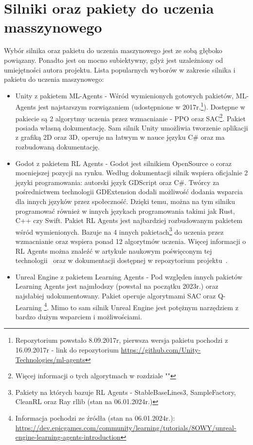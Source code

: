 \documentclass{SGGW-thesis}
\begin{document}
\section{Silniki oraz pakiety do uczenia masszynowego}
Wybór silnika oraz pakietu do uczenia maszynowego jest ze sobą głęboko powiązany. Ponadto jest on mocno subiektywny, gdyż jest uzależniony od umiejętności autora projektu. Lista popularnych wyborów w zakresie silnika i pakietu do uczenia maszynowego:
\begin{itemize}
  \item{Unity z pakietem ML-Agents - Wśród wymienionych gotowych pakietów, ML-Agents jest najstarszym rozwiązaniem (udostępnione w 2017r.\footnote{Repozytorium powstało 8.09.2017r, pierwsza wersja pakietu pochodzi z 16.09.2017r - link do repozytorium \url{https://github.com/Unity-Technologies/ml-agents}}).
  Dostępne w pakiecie są 2 algorytmy uczenia przez wzmacnianie - PPO oraz SAC\footnote{Więcej informacji o tych algorytmach w rozdziale ""}. Pakiet posiada własną dokumentację\cite{MLAgentsDocs}. 
  Sam silnik Unity umożliwia tworzenie aplikacji z grafiką 2D oraz 3D, operuje na łatwym w nauce języku C\# oraz ma rozbudowaną dokumentację\cite{UnityDocs}.}
  \item{Godot z pakietem RL Agents - Godot jest silnikiem OpenSource o coraz mocniejszej pozycji na rynku. Według dokumentacji\cite{GodotDocs}
  silnik wspiera oficjalnie 2 języki programowania: autorski język GDScript oraz C\#. Twórcy za pośrednictwem technologii GDExtension dodali możliwość dodania wsparcia dla innych języków przez społeczność.
  Dzięki temu, można na tym silniku programować również w innych językach programowania takimi jak Rust, C++ czy Swift. Pakiet RL Agents jest najbardziej rozbudowanym pakietem wśród wymienionych.
  Bazuje na 4 innych pakietach\footnote{Pakiety na których bazuje RL Agents - StableBaseLines3, SampleFactory, CleanRL oraz Ray rllib (stan na 06.01.2024r.)} do uczenia przez wzmacnianie
  oraz wspiera ponad 12 algorytmów uczenia. Więcej informacji o RL Agents można znaleźć w artykule naukowym poświęconym tej technologii~\cite{GodotRLAgentsArticle} oraz w dokumentacji dostępnej w repozytorium projektu~\cite{GodotRLAgentsDocs}.}
  \item{Unreal Engine z pakietem Learning Agents - Pod względen innych pakietów Learning Agents jest najmłodszy (powstał na początku 2023r.) oraz najsłabiej udokumentowany. Pakiet operuje algorytmami SAC oraz Q-Learning
  \footnote{Informacja pochodzi ze źródła (stan na 06.01.2024r.): \url{https://dev.epicgames.com/community/learning/tutorials/8OWY/unreal-engine-learning-agents-introduction}}. Mimo to sam silnik Unreal Engine jest potężnym narzędziem z bardzo dużym wsparciem i możliwościami.
}
\end{itemize}
\end{document}
